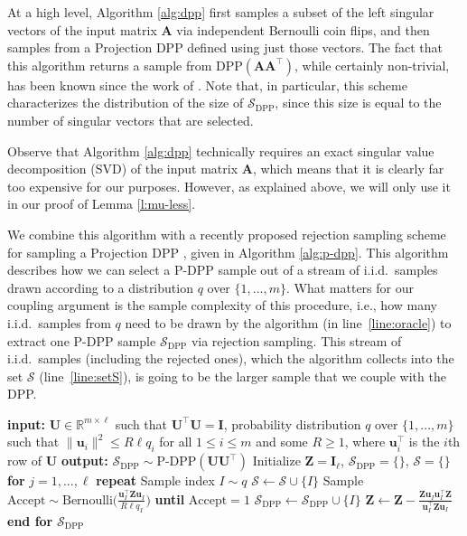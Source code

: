 \documentclass[11pt]{article}
\let\origtop\top
\renewcommand\top{{\scriptscriptstyle{\origtop}}}
\def\DPP{\mathrm{DPP}}
\def\u{{\mathbf u}}
\def\A{{\mathbf A}}
\def\I{{\mathbf I}}
\def\Z{{\mathbf Z}}
\def\setS{{\mathcal S}}
\def\R{{\mathbf R}}
\def\U{{\mathbf U}}
\def\R{{\mathds R}}
\begin{document}
At a high level, Algorithm \ref{alg:dpp} first samples a subset of the left singular vectors of the input matrix $\A$ via independent Bernoulli coin flips, and then samples from a Projection DPP defined using just those vectors. The fact that this algorithm returns a sample from $\DPP(\A\A^\top)$, while certainly non-trivial, has been known since the work of \cite{dpp-independence}. Note that, in particular, this scheme characterizes the distribution of the size of $\setS_{\DPP}$, since this size is equal to the number of singular vectors that are selected.

Observe that Algorithm \ref{alg:dpp} technically requires an exact singular value decomposition (SVD) of the input matrix $\A$, which means that it is clearly far too expensive for our purposes. However, as explained above, we will only use it in our proof of Lemma \ref{l:mu-less}.


We combine this algorithm with a recently proposed rejection sampling scheme for sampling a Projection DPP \cite{derezinski2019minimax}, given in Algorithm \ref{alg:p-dpp}. This algorithm describes how we can select a P-DPP sample out of a stream of i.i.d.~samples drawn according to a distribution $q$ over $\{1,...,m\}$. What matters for our coupling argument is the sample complexity of this procedure, i.e., how many i.i.d.~samples from $q$ need to be drawn by the algorithm (in line~\ref{line:oracle}) to extract one P-DPP sample $\setS_{\DPP}$ via rejection sampling. This stream of i.i.d.~samples (including the rejected ones), which the algorithm collects into the set $\setS$ (line~\ref{line:setS}), is going to be the larger sample that we couple with the DPP.

\begin{algorithm}
    \caption{Projection DPP sampler}\label{alg:p-dpp}
    \begin{algorithmic}[1]
    \State \textbf{input:} $\U\in\R^{m\times \ell}$ such that $\U^\top\U=\I$, probability distribution $q$ over $\{1,...,m\}$ such that $\|\u_i\|^2\leq R\ell q_i$ for all $1\leq i\leq m$ and some $R\geq 1$, where $\u_i^\top$ is the $i$th row of $\U$
    \State \textbf{output:} $\setS_{\DPP}\sim $P-DPP$(\U\U^\top)$
    \State Initialize $\Z = \I_\ell$, $\setS_{\DPP} = \{\}$, $\setS=\{\}$
    \State \textbf{for }$j=1,...,\ell$ 
    \State \quad\textbf{repeat}
    \State  \quad\quad Sample index $I \sim q$ \label{line:oracle}
    \State \quad\quad $\setS\leftarrow \setS\cup\{I\}$
    \label{line:setS}
    \State \quad\quad Sample \ $\mathrm{Accept}\sim
    \text{Bernoulli}\big(\frac{\u_{I}^\top\Z\u_{I}}{R\ell q_{I}}\big)$
    \State \quad\textbf{until} $\mathrm{Accept}=1$
    \State \quad $\setS_{\DPP}\leftarrow \setS_{\DPP}\cup\{I\}$
    \State \quad$\Z \leftarrow \Z -
    \frac{\Z\u_{I}\u_{I}^\top\Z}{\u_{I}^\top\Z\u_{I}}$
    \State \textbf{end for}
    \State \Return $\setS_{\DPP}$
    \end{algorithmic}
\end{algorithm}
\end{document}
